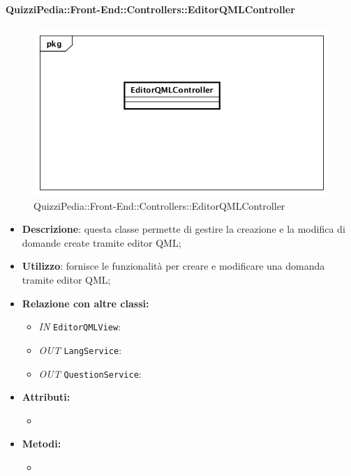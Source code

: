 \paragraph{QuizziPedia::Front-End::Controllers::EditorQMLController}
\begin{figure}
	\centering
	\includegraphics[scale=0.45]{UML/Classi/Front-End/QuizziPedia_Front-end_Controller_EditorQMLController.png}
	\caption{QuizziPedia::Front-End::Controllers::EditorQMLController}
\end{figure}
\begin{itemize}
	\item \textbf{Descrizione}: questa classe permette di gestire la creazione e la modifica di domande create tramite editor QML;
	\item \textbf{Utilizzo}: fornisce le funzionalità per creare e modificare una domanda tramite editor QML;
	\item \textbf{Relazione con altre classi:}
	\begin{itemize}
		\item \textit{IN} \texttt{EditorQMLView}:  
		\item \textit{OUT} \texttt{LangService}: 
		\item \textit{OUT} \texttt{QuestionService}: 
	\end{itemize}
	\item \textbf{Attributi:}
	\begin{itemize}
		\item 
	\end{itemize}
	\item \textbf{Metodi:}
	\begin{itemize}
		\item 
	\end{itemize}
\end{itemize}

